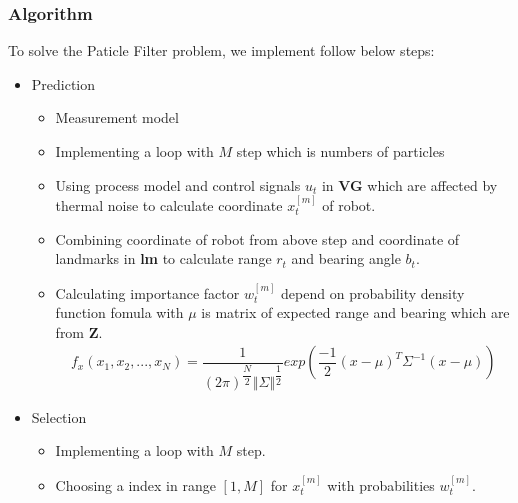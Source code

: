 \documentclass{article}
\begin{document}
\subsubsection{Algorithm}
To solve the Paticle Filter problem, we implement follow below steps: \\
\begin{itemize}
	\item{Prediction} 
	\begin{itemize}
		\begin{subequations} 
		Process model:
		\begin{align}
			x_t = x_{t-1} + V_t\Delta{t}\cos\left({\theta_t + \varphi_{t-1}}\right) \\
			y_t = y_{t-1} + V_t\Delta{t}\cos\left({\theta_t + \varphi_{t-1}}\right) \\
			\varphi_t = \varphi_{t-1} + \dfrac{V_t\Delta{t}\sin{\theta_t}}{WB}
		\end{align}
		\end{subequations}
		\begin{subequations}
		Measurement model:
		\begin{align}
			r_t = \sqrt{{\left(x_t - x_L\right)}^2 + {\left(y_t - y_L\right)}^2}\\
			b_t = \arctan{\dfrac{y_t - y_L}{x_t - x_L}} + \varphi_t
		\end{align}
		\end{subequations}
		\item{Measurement model}
		\item{Implementing a loop with $M$ step which is numbers of particles}
		\item{Using process model and control signals $u_t$ in \textbf{VG} which are affected by thermal noise to calculate coordinate $x^{[m]}_t$ of robot.}
		\item{Combining coordinate of robot from above step and coordinate of landmarks in \textbf{lm} to calculate range $r_t$ and bearing angle $b_t$.}
		\item{Calculating importance factor $w^{[m]}_t$ depend on probability density function fomula with $\mu$ is matrix of expected range and bearing which are from \textbf{Z}.}
		\begin{align}
			f_x(x_1,x_2,...,x_N) = \dfrac{1}{\left(2\pi\right)^{\dfrac{N}{2}}\Vert\Sigma\Vert^{\dfrac{1}{2}}}exp\left(\dfrac{-1}{2}\left(x-\mu\right)^T\Sigma^{-1}\left(x-\mu\right)\right)
		\end{align}
	\end{itemize}
	\item{Selection}
	\begin{itemize}
		\item{Implementing a loop with $M$ step.}
		\item{Choosing a index in range $\left[1,M\right]$ for $x^{[m]}_t$ with probabilities $w^{[m]}_t$.}
	\end{itemize}
\end{itemize}
\end{document}

